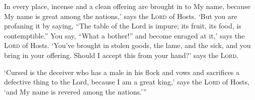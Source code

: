 \begin{inparaenum}
  \noindent In every place, incense and a clean offering are brought in to My name, because My name is great among the nations,' says the \textsc{Lord} of Hosts.%
   `But you are profaning it by saying, ``The table of the Lord is impure; its fruit, its food, is contemptible.''%
   You say, ``What a bother!'' and become enraged at it,' says the \textsc{Lord} of Hosts. `You've brought in stolen goods, the lame, and the sick, and you bring in your offering. Should I accept this from your hand?' says the \textsc{Lord}.%
  
   `Cursed is the deceiver who has a male in his flock and vows and sacrifices a defective thing to the Lord, because I am a great king,' says the \textsc{Lord} of Hosts, `and My name is revered among the nations.'\thinspace''%
\end{inparaenum}
